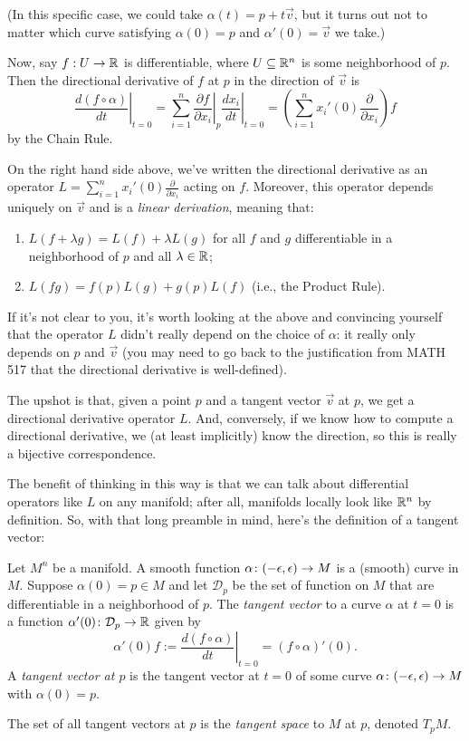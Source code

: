 (In this specific case, we could take $\alpha(t) = p + t\vec{v}$, but it turns out not to matter which curve satisfying $\alpha(0) = p$ and $\alpha'(0) = \vec{v}$ we take.)

Now, say $f: U \to \mathbb{R}$ is differentiable, where $U \subseteq \mathbb{R}^n$ is some neighborhood of $p$. Then the directional derivative of $f$ at $p$ in the direction of $\vec{v}$ is 
\[
	\left. \frac{d(f \circ \alpha)}{dt} \right|_{t=0} = \sum_{i=1}^n \left.\frac{\partial f}{\partial x_i}\right|_p \left. \frac{d x_i}{dt} \right|_{t=0} = \left(\sum_{i=1}^n x_i'(0) \frac{\partial}{\partial x_i}\right)f
\]
by the Chain Rule. 

On the right hand side above, we've written the directional derivative as an operator $L = \sum_{i=1}^n x_i'(0) \frac{\partial}{\partial x_i}$ acting on $f$. Moreover, this operator depends uniquely on $\vec{v}$ and is a \emph{linear derivation}, meaning that:
\begin{enumerate}
	\item \label{it:linearity of vector field} $L(f + \lambda g) = L(f) + \lambda L(g)$ for all $f$ and $g$ differentiable in a neighborhood of $p$ and all $\lambda \in \mathbb{R}$;
	\item $L(f g) = f(p) L(g) + g(p) L(f)$ (i.e., the Product Rule).
\end{enumerate}

If it's not clear to you, it's worth looking at the above and convincing yourself that the operator $L$ didn't really depend on the choice of $\alpha$: it really only depends on $p$ and $\vec{v}$ (you may need to go back to the justification from MATH 517 that the directional derivative is well-defined).

The upshot is that, given a point $p$ and a tangent vector $\vec{v}$ at $p$, we get a directional derivative operator $L$. And, conversely, if we know how to compute a directional derivative, we (at least implicitly) know the direction, so this is really a bijective correspondence.

The benefit of thinking in this way is that we can talk about differential operators like $L$ on any manifold; after all, manifolds locally look like $\mathbb{R}^n$ by definition. So, with that long preamble in mind, here's the definition of a tangent vector:

\begin{definition}\label{def:tangent vector}
	Let $M^n$ be a manifold. A smooth function $\alpha\colon\thinspace\! (-\epsilon, \epsilon) \to M$ is a (smooth) curve in $M$. Suppose $\alpha(0) = p \in M$ and let $\mathcal{D}_p$ be the set of function on $M$ that are differentiable in a neighborhood of $p$. The \emph{tangent vector} to a curve $\alpha$ at $t=0$ is a function $\alpha'(0)\colon\thinspace\! \mathcal{D}_p \to \mathbb{R}$ given by
	\[
		\alpha'(0)f := \left. \frac{d(f\circ \alpha)}{dt} \right|_{t=0} = (f\circ \alpha)'(0).
	\] 
	A \emph{tangent vector at $p$} is the tangent vector at $t=0$ of some curve $\alpha\colon\thinspace\! (-\epsilon, \epsilon) \to M$ with $\alpha(0) = p$.
	
	The set of all tangent vectors at $p$ is the \emph{tangent space} to $M$ at $p$, denoted $T_pM$.
\end{definition}

